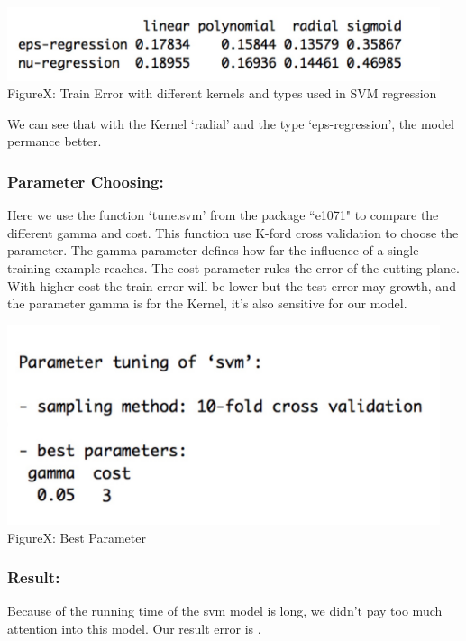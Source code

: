 \documentclass[12pt]{article}
\begin{document}
	\begin{center}
	\includegraphics[width=5in]{image/svmkernal.png}\\
	FigureX: Train Error with different kernels and types used in SVM regression
	\end{center}

	We can see that with the Kernel `radial' and the type `eps-regression', the model permance better.

	\subsubsection{Parameter Choosing:}

	Here we use the function `tune.svm' from the package ``e1071" to compare the different gamma and cost. This function use K-ford cross validation to choose the parameter. The gamma parameter defines how far the influence of a single training example reaches. The cost parameter rules the error of the cutting plane. With higher cost the train error will be lower but the test error may growth, and the parameter gamma is for the Kernel, it's also sensitive for our model.

	\begin{center}
	\includegraphics[width=5in]{image/svmp.jpeg}\\
	FigureX: Best Parameter
	\end{center}

	\subsubsection{Result:}

	Because of the running time of the svm model is long, we didn't pay too much attention into this model. Our result error is .
\end{document}
